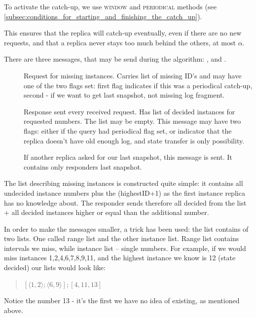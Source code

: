 

To activate the catch-up, we use \textsc{window} and \textsc{periodical} methods (see \ref{subsec:conditions_for_starting_and_finishing_the_catch_up}).

This ensures that the replica will catch-up eventually, even if there are no new requests, and that a replica never stays too much behind the others, at most $\alpha$.

There are three messages, that may be send during the algorithm: \catchUpQuery, \catchUpResponse and \catchUpSnapshot.
\begin{description}
 \item[\normalfont\catchUpQuery] Request for missing instances. Carries list of missing ID's and may have one of the two flags set: first flag indicates if this was a periodical catch-up, second - if we want to get last snapshot, not missing log fragment.
 \item[\normalfont\catchUpResponse] Response sent every received request. Has list of decided instances for requested numbers. The list may be empty. This message may have two flags: either if the query had periodical flag set, or indicator that the replica doesn't have old enough log, and state transfer is only possibility.
 \item[\normalfont\catchUpSnapshot] If another replica asked for our last snapshot, this message is sent. It contains only responders last snapshot.
\end{description}

The list describing missing instances is constructed quite simple: it contains all undecided instance numbers plus the (highestID+1) as the first instance replica has no knowledge about. The responder sends therefore all decided from the list + all decided instances higher or equal than the additional number.

In order to make the messages smaller, a trick has been used: the list contains of two lists. One called range list and the other instance list.
Range list contains intervals we miss, while instance list -- single numbers. For example, if we would miss instances 1,2,4,6,7,8,9,11, and the highest instance we know is 12 (state decided) our lists would look like:
\begin{quote}
$[\langle1,2\rangle; \langle6,9\rangle]; [4,11,13]$
\end{quote} 
Notice the number 13 - it's the first we have no idea of existing, as mentioned above.

